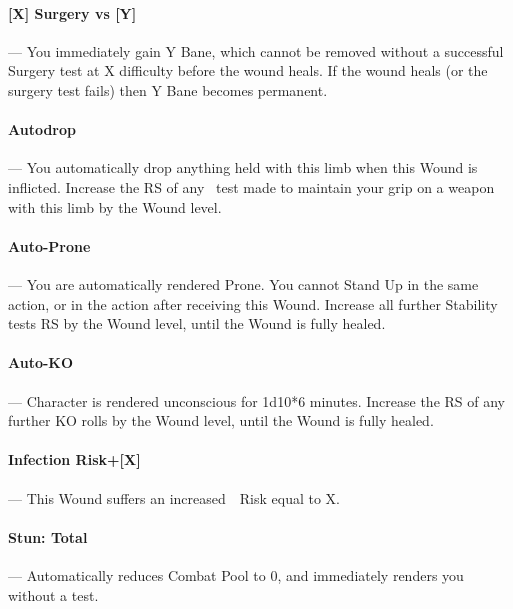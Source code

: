 \documentclass[oneside,11pt,english]{book}
\begin{document}
\vspace{-5pt}\paragraph[Surgery vs. ]{\label{par:Surgery vs}[X] Surgery vs [Y]}---\quad
You immediately gain Y Bane, which cannot be removed without a successful Surgery test at X difficulty before the wound heals. If the wound heals (or the surgery test fails) then Y Bane becomes permanent.

\vspace{-5pt}\paragraph{\label{par:Autodrop}Autodrop}---\quad 
You automatically drop anything held with this limb when this Wound is inflicted. Increase the RS of any ~test made to maintain your grip on a weapon with this limb by the Wound level. %

\vspace{-5pt}\paragraph{\label{par:Auto-Prone}Auto-Prone}---\quad
You are automatically rendered Prone. You cannot Stand Up in the same action, or in the action after receiving this Wound. Increase all further Stability tests RS by the Wound level, until the Wound is fully healed.

\vspace{-5pt}\paragraph{\label{par:Auto-KO}Auto-KO}---\quad
Character is rendered unconscious for 1d10*6 minutes. Increase the RS of any further KO rolls by the Wound level, until the Wound is fully healed.

\vspace{-5pt}\paragraph[Infection Risk]{\label{par:Infection Risk}Infection Risk+[X]}---\quad
This Wound suffers an increased~~Risk equal to X.

\vspace{-5pt}\paragraph[Total]{\label{par:Stun: Total}Stun: Total}---\quad
Automatically reduces Combat Pool to 0, and immediately renders you  without a test.
\end{document}
